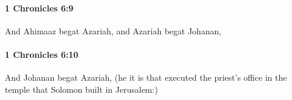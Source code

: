 		\paragraph{1 Chronicles 6:9} %
			\label{1CHRONICLES-6-9}

			And Ahimaaz begat Azariah, and Azariah begat Johanan,


		\paragraph{1 Chronicles 6:10} %
			\label{1CHRONICLES-6-10}

			And Johanan begat Azariah, (he it is that executed the priest’s office in the temple that Solomon built in Jerusalem:)


